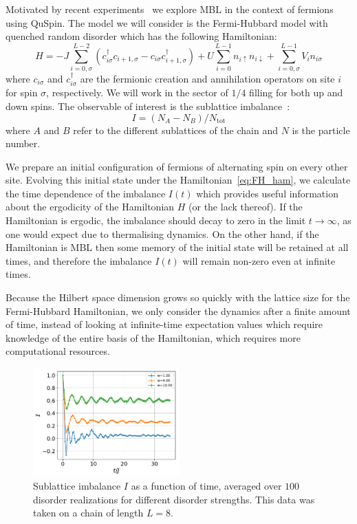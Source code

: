 \documentclass{SciPost}
\newcommand\0{\scalebox{-1}[1]{0}}
\begin{document}
Motivated by recent experiments~\cite{kondov_15,Schreiber15,ovadia_15,bordia_16,smith_16,choi_16,kucsko_16,lueschen_17,bordia_17,zhang_17} we explore MBL in the context of fermions using QuSpin. The model we will consider is the Fermi-Hubbard model with quenched random disorder which has the following Hamiltonian:
\begin{equation}
	H = -J\sum_{i=0,\sigma}^{L-2} \left(c^\dagger_{i\sigma}c_{i+1,\sigma} - c_{i\sigma}c^\dagger_{i+1,\sigma}\right) +U\sum_{i=0}^{L-1} n_{i\uparrow }n_{i\downarrow } + \sum_{i=0,\sigma}^{L-1} V_i n_{i\sigma}\label{eq:FH_ham}
\end{equation}
where $c_{i\sigma }$ and $c^\dagger_{i\sigma }$ are the fermionic creation and annihilation operators on site $i$ for spin $\sigma$, respectively. We will work in the sector of $1/4$ filling for both up and down spins. The observable of interest is the sublattice imbalance~\cite{Schreiber15,bordia_16,lueschen_17}:
\begin{equation}
	I = (N_A-N_B)/N_\mathrm{tot}
\end{equation}
where $A$ and $B$ refer to the different sublattices of the chain and $N$ is the particle number.

We prepare an initial configuration of fermions of alternating spin on every other site. Evolving this initial state under the Hamiltonian~\eqref{eq:FH_ham}, we calculate the time dependence of the imbalance $I(t)$ which provides useful information about the ergodicity of the Hamiltonian $H$ (or the lack thereof). If the Hamiltonian is ergodic, the imbalance should decay to zero in the limit $t\rightarrow\infty$, as one would expect due to thermalising dynamics. On the other hand, if the Hamiltonian is MBL then some memory of the initial state will be retained at all times, and therefore the imbalance $I(t)$ will remain non-zero even at infinite times.

Because the Hilbert space dimension grows so quickly with the lattice size for the Fermi-Hubbard Hamiltonian, we only consider the dynamics after a finite amount of time, instead of looking at infinite-time expectation values which require knowledge of the entire basis of the Hamiltonian, which requires more computational resources. 

\begin{figure}[t!]
	\centering
	\includegraphics[width=0.5\textwidth]{fermion_MBL.pdf}
	\caption{\label{fig:MBL} Sublattice imbalance $I$ as a function of time, averaged over $100$ disorder realizations for different disorder strengths. This data was taken on a chain of length $L=8$.}
\end{figure}
\end{document}
